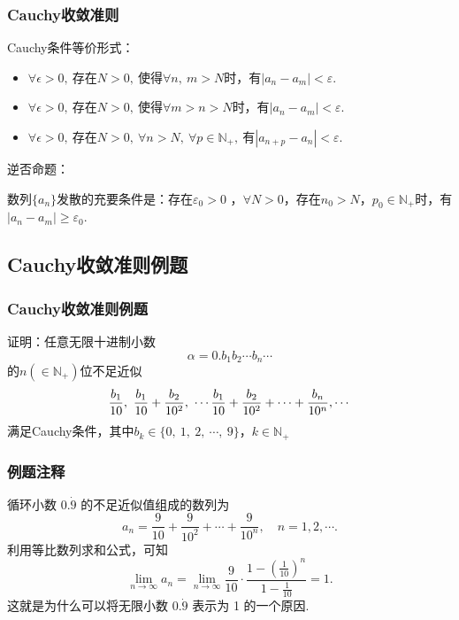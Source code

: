 \documentclass[mathserif]{beamer}
\begin{document}
\begin{frame}
\frametitle{Cauchy收敛准则}
\suojin Cauchy条件等价形式：
\begin{itemize}
\item $\forall \epsilon >0 ,\ \mbox{存在}N>0,\ \mbox{使得}\forall n,\ m>N\mbox{时，有}|a_n-a_m|<\varepsilon.$
\item $\forall \epsilon >0 ,\ \mbox{存在}N>0,\ \mbox{使得}\forall m>n>N\mbox{时，有}|a_n-a_m|<\varepsilon.$
\item $\forall \epsilon >0 ,\ \mbox{存在}N>0,\ \forall n>N,\ \forall p\in\mathbb{N}_{+},\ \mbox{有}|a_{n+p}-a_n|<\varepsilon.$
\end{itemize}
\jiange
\suojin 逆否命题：
\begin{thm}
\suojin 数列$\{a_{n}\}$发散的充要条件是：存在$\varepsilon_{0} >0$ ，$\forall N>0$，存在$n_{0}>N$，$ p_{0}\in \mathbb{N}_{+}$时，有\quad $|a_n-a_m|\geqslant\varepsilon_{0}.$
\end{thm}
\end{frame}



\subsection{Cauchy收敛准则例题}

\begin{frame}[label=li_7]
\frametitle{Cauchy收敛准则例题}
\begin{ex}
\suojin 证明：任意无限十进制小数
$$\alpha=0.b_{1}b_{2}\cdots b_{n}\cdots$$
的$n(\in\mathbb{N}_{+})$位不足近似
$$\ff{b_{1}}{10},\ \ff{b_{1}}{10}+\ff{b_{2}}{10^{2}},\ \cdots \ff{b_{1}}{10}+\ff{b_{2}}{10^{2}}+\cdots+\ff{b_{n}}{10^{n}},\cdots$$
满足Cauchy条件，其中$b_{k}\in\{0,\ 1,\ 2,\ \cdots ,\ 9\}$，$k\in\mathbb{N}_{+}$\jh
\end{ex}
\hfill\hyperlink{li_7jd<1>}{}
 \end{frame}


\begin{frame}
	\frametitle{例题注释}
	\suojin 循环小数 $0 . \dot{9}$ 的不足近似值组成的数列为
	$$
	a_n=\frac{9}{10}+\frac{9}{10^2}+\cdots+\frac{9}{10^n}, \quad n=1,2, \cdots .
	$$
	\suojin 利用等比数列求和公式，可知 
	$$\lim _{n \rightarrow \infty} a_n=\lim _{n \rightarrow \infty} \frac{9}{10} \cdot \frac{1-\left(\frac{1}{10}\right)^n}{1-\frac{1}{10}}=1.$$ 
	这就是为什么可以将无限小数 $0 . \dot{9}$ 表示为 1 的一个原因.
\end{frame}
\end{document}
